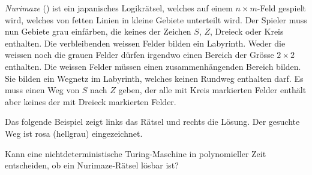 {\em Nurimaze}
()
ist ein japanisches Logikrätsel, welches auf einem
$n\times m$-Feld gespielt wird,
welches von fetten Linien in kleine Gebiete unterteilt wird.
Der Spieler muss nun
Gebiete grau einfärben, die keines der Zeichen $S$, $Z$, Dreieck oder
Kreis enthalten.
Die verbleibenden weissen Felder bilden ein Labyrinth.
Weder die weissen noch die grauen Felder dürfen irgendwo einen Bereich
der Grösse $2\times 2$ enthalten.
Die weissen Felder müssen einen zusammenhängenden Bereich bilden.
Sie bilden ein Wegnetz im Labyrinth, welches keinen Rundweg enthalten darf.
Es muss einen Weg von $S$ nach $Z$ geben, der alle mit Kreis markierten 
Felder enthält aber keines der mit Dreieck markierten Felder.

Das folgende Beispiel zeigt links das Rätsel und rechts die Lösung.
Der gesuchte Weg ist rosa (hellgrau) eingezeichnet.

\begin{center}
\end{center}
Kann eine nichtdeterministische Turing-Maschine in polynomieller Zeit
entscheiden, ob ein Nurimaze-Rätsel lösbar ist?


